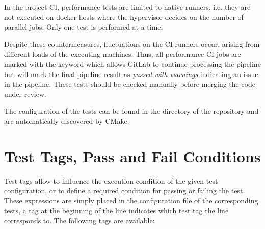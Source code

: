 In the project CI, performance tests are limited to native runners, i.e. they are not executed on docker hosts where the hypervisor decides on the number of parallel jobs.
Only one test is performed at a time.

Despite these countermeasures, fluctuations on the CI runners occur, arising from different loads of the executing machines.
Thus, all performance CI jobs are marked with the  keyword which allows GitLab to continue processing the pipeline but will mark the final pipeline result as \emph{passed with warnings} indicating an issue in the pipeline.
These tests should be checked manually before merging the code under review.

The configuration of the tests can be found in the  directory of the repository and are automatically discovered by CMake.

\section{Test Tags, Pass and Fail Conditions}

Test tags allow to influence the execution condition of the given test configuration, or to define a required condition for passing or failing the test.
These expressions are simply placed in the configuration file of the corresponding tests, a tag at the beginning of the line indicates which test tag the line corresponds to.
The following tags are available:

